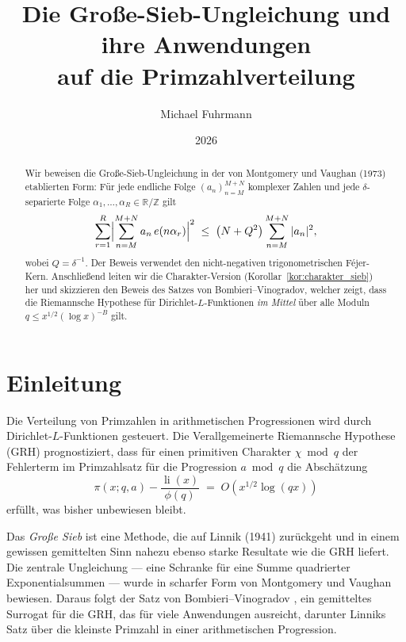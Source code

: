 \documentclass[12pt,a4paper]{amsart}
\theoremstyle{definition}
\newcommand{\Z}{\mathbb{Z}}
\newcommand{\R}{\mathbb{R}}
\DeclareMathOperator{\li}{li}
\newcommand{\eexp}[1]{e\!\left(#1\right)}
\begin{document}

\title{Die Große-Sieb-Ungleichung und ihre Anwendungen\\
       auf die Primzahlverteilung}

\author{Michael Fuhrmann}
\address{Specialist Mathematics Project, Build 153}
\date{2026}

\begin{abstract}
Wir beweisen die Große-Sieb-Ungleichung in der von Montgomery und Vaughan
(1973) etablierten Form: Für jede endliche Folge $(a_n)_{n=M}^{M+N}$
komplexer Zahlen und jede $\delta$-separierte Folge
$\alpha_1,\ldots,\alpha_R \in \R/\Z$ gilt
\[
  \sum_{r=1}^{R}\Bigl|\sum_{n=M}^{M+N} a_n\,\eexp{n\alpha_r}\Bigr|^{2}
  \;\leq\;
  \bigl(N + Q^{2}\bigr)\sum_{n=M}^{M+N}|a_n|^{2},
\]
wobei $Q = \delta^{-1}$.  Der Beweis verwendet den nicht-negativen
trigonometrischen Féjer-Kern.  Anschließend leiten
wir die Charakter-Version (Korollar~\ref{kor:charakter_sieb}) her und
skizzieren den Beweis des Satzes von Bombieri--Vinogradov, welcher zeigt,
dass die Riemannsche Hypothese für Dirichlet-$L$-Funktionen \emph{im Mittel}
über alle Moduln $q \leq x^{1/2}(\log x)^{-B}$ gilt.
\end{abstract}

\maketitle
\tableofcontents

\section{Einleitung}

Die Verteilung von Primzahlen in arithmetischen Progressionen wird durch
Dirichlet-$L$-Funktionen gesteuert.  Die Verallgemeinerte Riemannsche
Hypothese (GRH) prognostiziert, dass für einen primitiven Charakter
$\chi \bmod q$ der Fehlerterm im Primzahlsatz für die Progression
$a \bmod q$ die Abschätzung
\[
  \pi(x;q,a) - \frac{\li(x)}{\phi(q)}
  \;=\; O\!\left(x^{1/2}\log(qx)\right)
\]
erfüllt, was bisher unbewiesen bleibt.

Das \emph{Große Sieb} ist eine Methode, die auf Linnik (1941) zurückgeht und
in einem gewissen gemittelten Sinn nahezu ebenso starke Resultate wie die GRH
liefert.  Die zentrale Ungleichung --- eine Schranke für eine Summe quadrierter
Exponentialsummen --- wurde in scharfer Form von Montgomery und Vaughan
\cite{MV1973} bewiesen.  Daraus folgt der Satz von Bombieri--Vinogradov
\cite{Bombieri1965}, ein gemitteltes Surrogat für die GRH, das für viele
Anwendungen ausreicht, darunter Linniks Satz über die kleinste Primzahl in
einer arithmetischen Progression.
\end{document}
